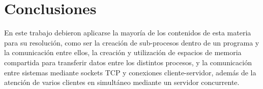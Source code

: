 \section{Conclusiones}
    En este trabajo debieron aplicarse la mayoría de los contenidos de esta materia para su resolución, como ser la creación de sub-procesos dentro de un programa y la comunicación entre ellos, la creación y utilización de espacios de memoria compartida para transferir datos entre los distintos procesos, y la comunicación entre sistemas mediante sockets TCP y conexiones cliente-servidor, además de la atención de varios clientes en simultáneo mediante un servidor concurrente.
\\
